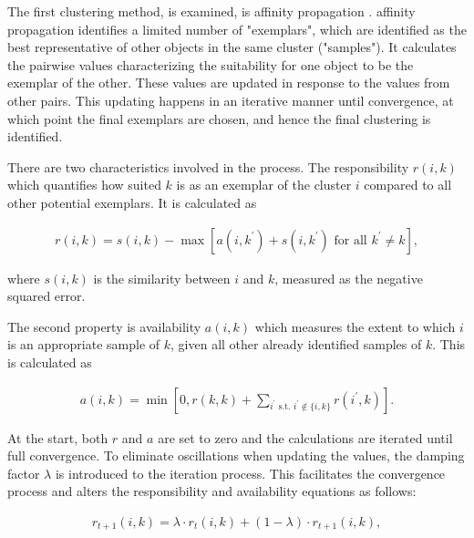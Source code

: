 \documentclass[a4paper,12pt]{article}
\begin{document}
The first clustering method, is examined, is affinity propagation \citep{freyDueck07}. affinity propagation identifies a limited number of "exemplars", which are identified as the best representative of other objects in the same cluster ("samples"). It calculates the pairwise values characterizing the suitability for one object to be the exemplar of the other. These values are updated in response to the values from other pairs. This updating happens in an iterative manner until convergence, at which point the final exemplars are chosen, and hence the final clustering is identified.

There are two characteristics involved in the process. The responsibility $r\left(i,k\right)$ which quantifies how suited $k$ is as an exemplar of the cluster $i$ compared to all other potential exemplars. It is calculated as

\begin{align}\label{eq:affinityPropagationExemplars}
    r\left(i,k\right) = s\left(i,k\right) - \max\left[a\left(i,k^\prime\right) + s\left(i,k^\prime\right) \text{ for all } k^\prime \neq k\right],
\end{align}

where $s\left(i,k\right)$ is the similarity between $i$ and $k$, measured as the negative squared error.

The second property is availability $a\left(i,k\right)$ which measures the extent to which $i$ is an appropriate sample of $k$, given all other already identified samples of $k$. This is calculated as

\begin{align}\label{eq:availabilityAffinityPropagation}
    a\left(i,k\right) = \min\left[0, r\left(k,k\right) + \sum_{i^\prime \text{ s.t. } i^\prime \notin \{i,k\}} r\left(i^\prime,k\right)\right].
\end{align}

At the start, both $r$ and $a$ are set to zero and the calculations are iterated until full convergence. To eliminate oscillations when updating the values, the damping factor $\lambda$ is introduced to the iteration process. This facilitates the convergence process and alters the responsibility and availability equations as follows:

\begin{align}\label{eq:responsibilityAffinityPropagation}
    r_{t+1}\left(i,k\right) = \lambda \cdot r_t\left(i,k\right) + (1-\lambda) \cdot r_{t+1}\left(i,k\right),
\end{align}
\end{document}

